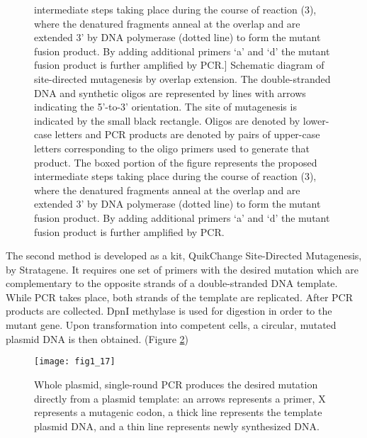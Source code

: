 \begin{refsection}
\begin{figure}[h!]
        intermediate steps taking place during the course of reaction (3),
        where the denatured fragments anneal at the overlap and are extended 3’
        by DNA polymerase (dotted line) to form the mutant fusion product. By
        adding additional primers ‘a’ and ‘d’ the mutant fusion product is
        further amplified by PCR.]
        {Schematic diagram of site-directed mutagenesis by overlap extension.
            The double-stranded DNA and synthetic oligos are represented by lines
            with arrows indicating the 5’-to-3’ orientation. The site of
            mutagenesis is indicated by the small black rectangle. Oligos are
            denoted by lower-case letters and PCR products are denoted by pairs
            of upper-case letters corresponding to the oligo primers used to
            generate that product. The boxed portion of the figure represents
            the proposed intermediate steps taking place during the course of
            reaction (3), where the denatured fragments anneal at the overlap
            and are extended 3’ by DNA polymerase (dotted line) to form the
            mutant fusion product. By adding additional primers ‘a’ and ‘d’ the
            mutant fusion product is further amplified by PCR\cite{Ho1989}.}
            \label{fig:sdm-1} 
\end{figure}
The second method is developed as a kit, QuikChange Site-Directed Mutagenesis,
by Stratagene\cite{Arnold2003}. It requires one set of primers with the desired
mutation which are complementary to the opposite strands of a double-stranded
DNA template. While PCR takes place, both strands of the template are
replicated. After PCR products are collected. DpnI methylase is used for
digestion in order to the mutant gene.  Upon transformation into competent
cells, a circular, mutated plasmid DNA is then obtained\cite{Antikainen2005a}.
(Figure \ref{fig:sdm-2})
\begin{figure}[h!] \centering \texttt{[image: fig1\_17]}
    \caption[Whole plasmid, single-round PCR produces the desired mutation
    directly from a plasmid template: an arrows represents a primer, X
    represents a mutagenic codon, a thick line represents the template plasmid
    DNA, and a thin line represents newly synthesized DNA.]{Whole plasmid,
        single-round PCR produces the desired mutation directly from a plasmid
        template: an arrows represents a primer, X represents a mutagenic
        codon, a thick line represents the template plasmid DNA, and a thin
        line represents newly synthesized DNA\cite{Antikainen2005a}.}
        \label{fig:sdm-2}
\end{figure}


\end{refsection}
